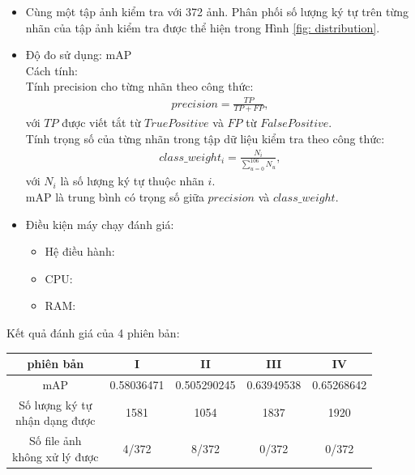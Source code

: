 \documentclass[a4paper,12pt]{article}
\begin{document}
	\begin{itemize}
		\item Cùng một tập ảnh kiểm tra với 372 ảnh. Phân phối số lượng ký tự trên từng nhãn của tập ảnh kiểm tra được thể hiện trong Hình \ref{fig: distribution}.
		\item Độ đo sử dụng: mAP\\
		Cách tính:\\ Tính precision cho từng nhãn theo công thức\cite{mAP}:
		\begin{align}
		precision = \frac{TP}{TP+FP},
		\end{align}
		\hspace{2cm}với $TP$ được viết tắt từ $True Positive$\cite{mAP} và $FP$ từ $False Positive$\cite{mAP}.\\
		Tính trọng số của từng nhãn trong tập dữ liệu kiểm tra theo công thức:
		\begin{align}
		class\_weight_i = \frac{N_i}{\sum_{u=0}^{106}N_u},
		\end{align}
		\hspace{2cm}với $N_i$ là số lượng ký tự thuộc nhãn $i$.\\
		mAP là trung bình có trọng số giữa $precision$ và $class\_weight$.
		\item Điều kiện máy chạy đánh giá:
		\begin{itemize}
			\item Hệ điều hành:
			\item CPU:
			\item RAM:
		\end{itemize}
	\end{itemize}
	Kết quả đánh giá của 4 phiên bản:
	\vspace{0.5cm}
	\begin{center}
		\begin{tabular}{||c | c | c | c | c||} 
			\hline
			phiên bản & I&II&III&IV\\[0.5ex] 
			\hline\hline
			mAP&0.58036471&0.505290245&0.63949538&0.65268642\\
			\hline
			\makecell{Số lượng ký tự\\ nhận dạng được}&1581&1054&1837&1920\\
			\hline
			\makecell{Số file ảnh\\ không xử lý được}&4/372&8/372&0/372&0/372\\
			\hline
		\end{tabular}
	\end{center}
	\vspace{1.5cm}
\end{document}
